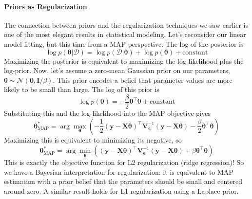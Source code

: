 \paragraph*{Priors as Regularization}
The connection between priors and the regularization techniques we saw earlier is one of the most elegant results in statistical modeling. Let's reconsider our linear model fitting, but this time from a MAP perspective. The log of the posterior is
\begin{equation}
\log p(\boldsymbol{\theta}|\mathcal{D}) = \log p(\mathcal{D}|\boldsymbol{\theta}) + \log p(\boldsymbol{\theta}) + \text{constant} \end{equation}
Maximizing the posterior is equivalent to maximizing the log-likelihood plus the log-prior. Now, let's assume a zero-mean Gaussian prior on our parameters, $\boldsymbol{\theta} \sim \mathcal{N}(\mathbf{0}, \mathbf{I}/\beta)$. This prior encodes a belief that parameter values are more likely to be small than large. The log of this prior is
\begin{equation}
    \log p(\boldsymbol{\theta}) = -\frac{\beta}{2}\boldsymbol{\theta}^\top\boldsymbol{\theta} + \text{constant}
\end{equation}
Substituting this and the log-likelihood into the MAP objective gives
\begin{equation}
    \boldsymbol{\theta}_{\text{MAP}}^* = \arg\max_{\boldsymbol{\theta}} \left( -\frac{1}{2}(\mathbf{y} - \mathbf{X}\boldsymbol{\theta})^\top \mathbf{V}_{\boldsymbol{\epsilon}}^{-1}(\mathbf{y} - \mathbf{X}\boldsymbol{\theta}) - \frac{\beta}{2}\boldsymbol{\theta}^\top\boldsymbol{\theta} \right)
\end{equation}
Maximizing this is equivalent to minimizing its negative, so
\begin{equation}
    \boldsymbol{\theta}_{\text{MAP}}^* = \arg\min_{\boldsymbol{\theta}} \left( (\mathbf{y} - \mathbf{X}\boldsymbol{\theta})^\top \mathbf{V}_{\boldsymbol{\epsilon}}^{-1}(\mathbf{y} - \mathbf{X}\boldsymbol{\theta}) + \beta\boldsymbol{\theta}^\top\boldsymbol{\theta} \right)
\end{equation}
This is exactly the objective function for L2 regularization (ridge regression)! So we have a Bayesian interpretation for regularization: it is equivalent to MAP estimation with a prior belief that the parameters should be small and centered around zero. A similar result holds for L1 regularization using a Laplace prior.

